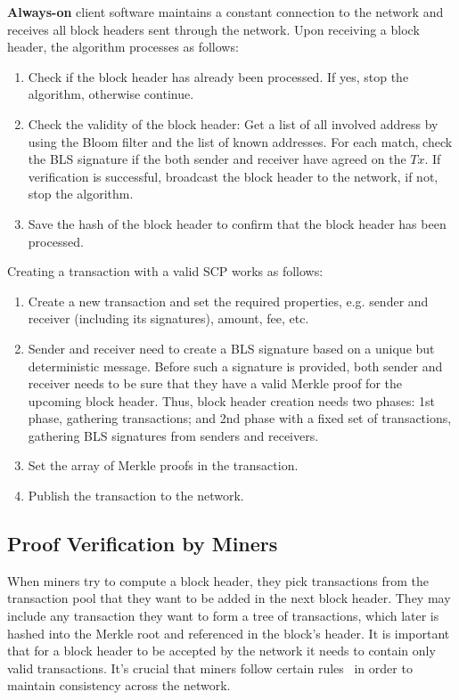 \documentclass[conference]{IEEEtran}
\begin{document}
\textbf{Always-on} client software maintains a constant connection to the network and receives all block headers sent through the network. Upon receiving a block header, the algorithm processes as follows:
\begin{enumerate}
 \item Check if the block header has already been processed. If yes, stop the algorithm, otherwise continue.
 \item Check the validity of the block header: Get a list of all involved address by using the Bloom filter and the list of known addresses. For each match, check the BLS signature if the both sender and receiver have agreed on the $Tx$. If verification is successful, broadcast the block header to the network, if not, stop the algorithm.
 \item Save the hash of the block header to confirm that the block header has been processed.
\end{enumerate}
Creating a transaction with a valid SCP works as follows:
\begin{enumerate}
 \item Create a new transaction and set the required properties, e.g. sender and receiver (including its signatures), amount, fee, etc.
 \item Sender and receiver need to create a BLS signature based on a unique but deterministic message. Before such a signature is provided, both sender and receiver needs to be sure that they have a valid Merkle proof for the upcoming block header. Thus, block header creation needs two phases: 1st phase, gathering transactions; and 2nd phase with a fixed set of transactions, gathering BLS signatures from senders and receivers.
 \item Set the array of Merkle proofs in the transaction.
 \item Publish the transaction to the network.
\end{enumerate}

\subsection{Proof Verification by Miners}
\label{Design:ProofVerification}
When miners try to compute a block header, they pick transactions from the transaction pool that they want to be added in the next block header. They may include any transaction they want to form a tree of transactions, which later is hashed into the Merkle root and referenced in the block's header. It is important that for a block header to be accepted by the network it needs to contain only valid transactions. It's crucial that miners follow certain rules~\cite{ProtocolRules} in order to maintain consistency across the network. 
\end{document}
